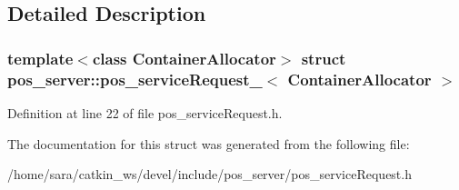 \subsection{Detailed Description}
\subsubsection*{template$<$class Container\+Allocator$>$\newline
struct pos\+\_\+server\+::pos\+\_\+service\+Request\+\_\+$<$ Container\+Allocator $>$}



Definition at line 22 of file pos\+\_\+service\+Request.\+h.



The documentation for this struct was generated from the following file\+:\begin{DoxyCompactItemize}
\item 
/home/sara/catkin\+\_\+ws/devel/include/pos\+\_\+server/pos\+\_\+service\+Request.\+h\end{DoxyCompactItemize}
